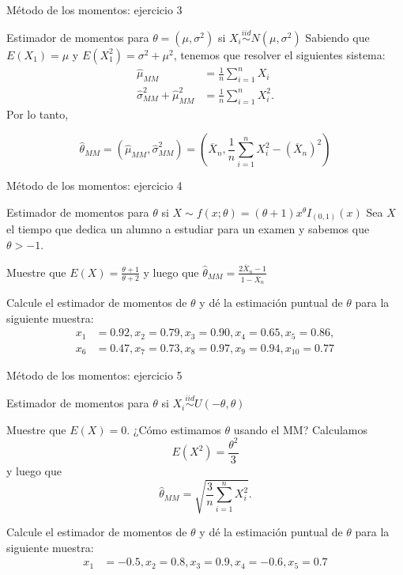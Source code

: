 \documentclass{beamer}
\theoremstyle{definition}
\begin{document}
\begin{frame}{\color{rosee}M\'etodo de los momentos: ejercicio 3}
  \begin{exampleblock}{Estimador de momentos para $\theta=(\mu,\sigma^2)$ si $X_i\stackrel{iid}{\sim}N(\mu,\sigma^2)$}
   Sabiendo que $E(X_1)=\mu$ y $E(X_{1}^{2})=\sigma^{2}+\mu^{2}$, tenemos que resolver el siguientes sistema:
    \begin{align*}
      \widehat{\mu}_{MM}&=\frac{1}{n}\sum_{i=1}^{n}X_{i}\\
      \widehat{\sigma}_{MM}^{2}+\widehat{\mu}_{MM}^{2}&=\frac{1}{n}\sum_{i=1}^{n}X_{i}^{2}.
    \end{align*}
Por lo tanto,

\[\widehat{\theta}_{MM}=(\widehat{\mu}_{MM},\widehat{\sigma}^2_{MM})=\left(\overline{X}_{n}, \frac{1}{n}\sum_{i=1}^{n}X_{i}^{2}
    - (\overline{X}_{n})^{2}\right)\]  
  \end{exampleblock}
\end{frame}

\begin{frame}{\color{rosee}M\'etodo de los momentos: ejercicio 4}
  \begin{exampleblock}{Estimador de momentos para $\theta$ si $X\sim f(x;\theta)=(\theta+1)x^{\theta} I_{(0,1)}(x)$}
    Sea $X$ el tiempo que dedica un alumno a estudiar para un
    examen y sabemos que $\theta>-1$. 
    
    \bigskip 
    
    Muestre que $E(X)=\frac{\theta+1}{\theta +2}$ y luego que $\widehat{\theta}_{MM}=\frac{2\overline{X}_n-1}{1-\overline{X}_n}$
    
    \bigskip Calcule el estimador de momentos de $\theta$ y dé la estimación puntual de $\theta$ para la siguiente muestra:
    \begin{align*}
      x_{1}&=0.92, x_{2}=0.79, x_{3}=0.90,x_{4}=0.65, x_{5}=0.86,\\
      x_{6}&=0.47, x_{7}=0.73, x_{8}=0.97, x_{9}=0.94, x_{10}=0.77
    \end{align*}
  \end{exampleblock}
\end{frame}

\begin{frame}{\color{rosee}M\'etodo de los momentos: ejercicio 5}
  \begin{exampleblock}{Estimador de momentos para $\theta$ si $X_i\stackrel{iid}{\sim} U(-\theta,\theta)$}

    Muestre que $E(X)=0$. ¿Cómo estimamos $\theta$ usando el MM? Calculamos \[E(X^2)=\frac{\theta^2}{3}\] y luego que \[\widehat{\theta}_{MM}=\sqrt{\frac{3}{n}\sum_{i=1}^nX_i^2}.\]
    
    \bigskip Calcule el estimador de momentos de $\theta$ y dé la estimación puntual de $\theta$ para la siguiente muestra:
    \begin{align*}
      x_{1}&=-0.5, x_{2}=0.8, x_{3}=0.9,x_{4}=-0.6, x_{5}=0.7
    \end{align*}
  \end{exampleblock}
\end{frame}
\end{document}

